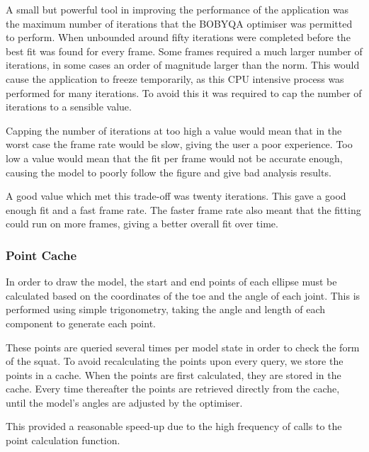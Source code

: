 A small but powerful tool in improving the performance of the application was the maximum number of iterations that the BOBYQA optimiser was permitted to perform. When unbounded around fifty iterations were completed before the best fit was found for every frame. Some frames required a much larger number of iterations, in some cases an order of magnitude larger than the norm. This would cause the application to freeze temporarily, as this CPU intensive process was performed for many iterations. To avoid this it was required to cap the number of iterations to a sensible value.

Capping the number of iterations at too high a value would mean that in the worst case the frame rate would be slow, giving the user a poor experience. Too low a value would mean that the fit per frame would not be accurate enough, causing the model to poorly follow the figure and give bad analysis results.

A good value which met this trade-off was twenty iterations. This gave a good enough fit and a fast frame rate. The faster frame rate also meant that the fitting could run on more frames, giving a better overall fit over time.

\subsubsection{Point Cache}

In order to draw the model, the start and end points of each ellipse must be calculated based on the coordinates of the toe and the angle of each joint. This is performed using simple trigonometry, taking the angle and length of each component to generate each point.

These points are queried several times per model state in order to check the form of the squat. To avoid recalculating the points upon every query, we store the points in a cache. When the points are first calculated, they are stored in the cache. Every time thereafter the points are retrieved directly from the cache, until the model's angles are adjusted by the optimiser.

This provided a reasonable speed-up due to the high frequency of calls to the point calculation function.